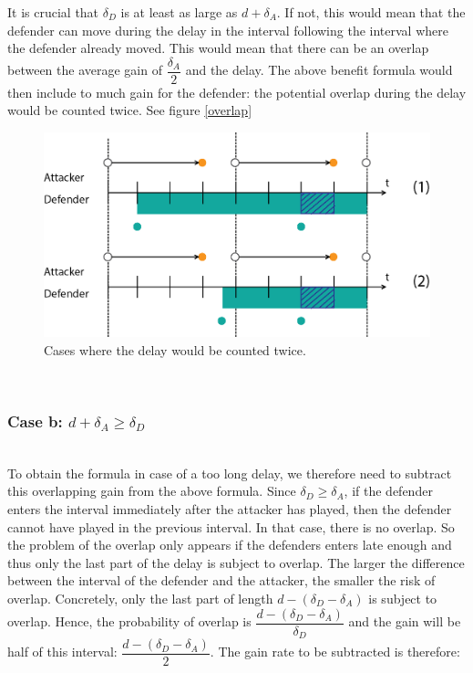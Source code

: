 It is crucial that $ \delta_{D}$ is at least as large as $d + \delta_{A}$. If not, this would mean that the defender can move during the delay in the interval following the interval where the defender already moved. This would mean that there can be an overlap between the average gain of $\dfrac{\delta_{A}}{2}$ and the delay. The above benefit formula would then include to much gain for the defender: the potential overlap during the delay would be counted twice. See figure \ref{overlap}\\
\begin{figure}[hbtp]
\caption{Cases where the delay would be counted twice.}
\centering
\includegraphics[scale=0.7]{Images/FlipItcase2b.png}
\end{figure}


~~ \\
\subsubsection*{\textbf{Case b:} $d + \delta_{A} \geq \delta_{D}$}
~~~\\

To obtain the formula in case of a too long delay, we therefore need to subtract this overlapping gain from the above formula. 
Since $\delta_{D} \geq \delta_{A}$, if the defender enters the interval immediately after the attacker has played, then the defender cannot have played in the previous interval. In that case, there is no overlap. So the problem of the overlap only appears if the defenders enters late enough and thus only the last part of the delay is subject to overlap. The larger the difference between the interval of the defender and the attacker, the smaller the risk of overlap. Concretely, only the last part of length $d - (\delta_{D} - \delta_{A})$ is subject to overlap. Hence, the probability of overlap is $\dfrac{ d - (\delta_{D} - \delta_{A})}{\delta_{D}}$ and the gain will be half of this interval:  $\dfrac{ d - (\delta_{D} - \delta_{A})}{2}$.  The gain rate to be subtracted is therefore:\\

